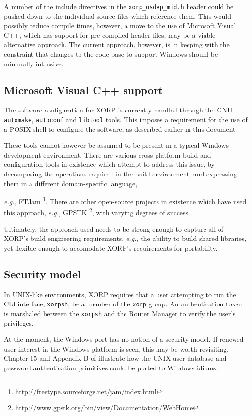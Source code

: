\documentclass[11pt]{article}
\newcommand{\eg}{\emph{e.g.,}\xspace}
\begin{document}
{A number of the include directives in the {\tt xorp\_osdep\_mid.h} header could
be pushed down to the individual source files which reference them. This
would possibly reduce compile times, however, a move to the use of
Microsoft Visual C++, which has support for pre-compiled header files,
may be a viable alternative approach. The current approach, however,
is in keeping with the constraint that
changes to the code base to support Windows should be minimally intrusive.

\subsection{Microsoft Visual C++ support}

The software configuration for XORP is currently handled through
the GNU {\tt automake}, {\tt autoconf} and {\tt libtool} tools.
This imposes a requirement
for the use of a POSIX shell to configure the software, as described
earlier in this document.

These tools cannot however be assumed to be present in a typical
Windows development environment. There are various cross-platform
build and configuration tools in existence which attempt to address
this issue, by decomposing the operations required in the build
environment, and expressing them in a different domain-specific
language, {\eg FTJam
\footnote{\url{http://freetype.sourceforge.net/jam/index.html}}.
There are other open-source projects in existence which have
used this approach, \eg GPSTK
\footnote{\url{http://www.gpstk.org/bin/view/Documentation/WebHome}},
with varying degrees of success.

Ultimately, the approach used needs to be strong enough
to capture all of XORP's build engineering requirements,
\eg the ability to build shared libraries,
yet flexible enough to accomodate XORP's requirements
for portability.

\subsection{Security model}

In UNIX-like environments, XORP requires that a user attempting to run
the CLI interface, {\tt xorpsh}, be a member of the {\tt xorp} group. An
authentication token is marshaled between the {\tt xorpsh} and the
Router Manager to verify the user's privileges.

At the moment, the Windows port has no notion of a security model. If
renewed user interest
in the Windows platform is seen, this may be worth revisiting.
Chapter 15 and Appendix B of \cite{hart2004wsp} illustrate how the
UNIX user database and password authentication primitives could be
ported to Windows idioms.

}}
\end{document}
